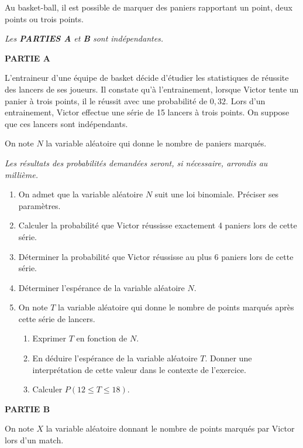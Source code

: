 Au basket-ball, il est possible de marquer des paniers rapportant un point, deux points ou trois points.

\textit{Les \textbf{PARTIES A} et \textbf{B} sont indépendantes.}

\medskip

\textbf{PARTIE A}

\medskip

L'entraineur d'une équipe de basket décide d'étudier les statistiques de réussite des lancers de ses joueurs. Il constate qu'à l'entrainement, lorsque Victor tente un panier à trois points, il le réussit avec une probabilité de $0,32$.
Lors d'un entrainement, Victor effectue une série de 15 lancers à trois points. On suppose que ces lancers sont indépendants.

\smallskip

On note $N$ la variable aléatoire qui donne le nombre de paniers marqués.

\smallskip

\textit{Les résultats des probabilités demandées seront, si nécessaire, arrondis au millième.}

\begin{enumerate}
	\item On admet que la variable aléatoire $N$ suit une loi binomiale. Préciser ses paramètres.
	\item Calculer la probabilité que Victor réussisse exactement 4 paniers lors de cette série.
	\item Déterminer la probabilité que Victor réussisse au plus 6 paniers lors de cette série.
	\item Déterminer l'espérance de la variable aléatoire $N$.
	\item On note $T$ la variable aléatoire qui donne le nombre de points marqués après cette série de lancers.
	\begin{enumerate}
		\item Exprimer $T$ en fonction de $N$.
		\item En déduire l'espérance de la variable aléatoire $T$. Donner une interprétation de cette valeur dans le contexte de l'exercice.
		\item Calculer $P(12 \leqslant T \leqslant 18)$.
	\end{enumerate}
\end{enumerate}

\textbf{PARTIE B}

\medskip

On note $X$ la variable aléatoire donnant le nombre de points marqués par Victor lors d'un match.


